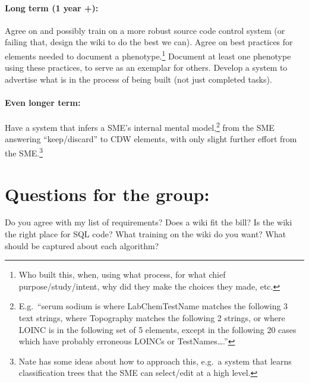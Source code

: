 \documentclass{tufte-handout}
\begin{document}
\paragraph{Long term (1 year +):}
Agree on and possibly train on a more robust source code control
system (or failing that, design the wiki to do the best we can). Agree
on best practices for elements needed to document a
phenotype.\footnote{Who built this, when, using what process, for what
  chief purpose/study/intent, why did they make the choices they made,
  etc.} Document at least one phenotype using these practices, to
serve as an exemplar for others. Develop a system to advertise what is
in the process of being built (not just completed tasks).

\paragraph{Even longer term:}
Have a system that infers a SME's internal mental
model,\footnote{E.g.\ ``serum sodium is where LabChemTestName matches
  the following 3 text strings, where Topography matches the following
  2 strings, or where LOINC is in the following set of 5 elements,
  except in the following 20 cases which have probably erroneous
  LOINCs or TestNames\ldots{}.''} from the SME answering
``keep/discard'' to CDW elements, with only slight further effort from
the SME.\footnote{Nate has some ideas about how to approach this, e.g.\ a
system that learns classification trees that the SME can select/edit
at a high level.}

\section{Questions for the group:}

Do you agree with my list of requirements? Does a wiki fit the bill?
Is the wiki the right place for SQL code? What training on the wiki do
you want? What should be captured about each algorithm?
\end{document}
